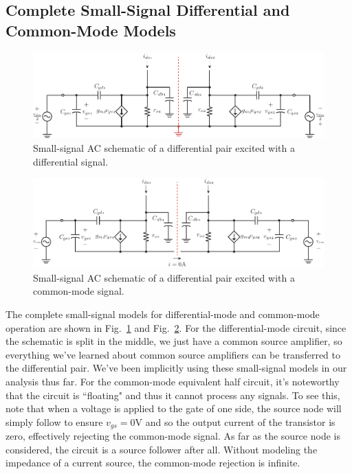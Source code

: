  
\subsection{Complete Small-Signal Differential and Common-Mode Models}

\begin{figure}[tb]
\begin{center}
\includegraphics[width=\columnwidth]{DM_symmetry_small_signal.pdf}
\end{center}
\caption{Small-signal AC schematic of a differential pair excited with a differential signal.} \label{fig:DM_symmetry_small_signal.pdf}
\end{figure}


\begin{figure}[tb]
\begin{center}
\includegraphics[width=\columnwidth]{CM_symmetry_small_signal.pdf}
\end{center}
\caption{Small-signal AC schematic of a differential pair excited with a common-mode signal.} \label{fig:CM_symmetry_small_signal.pdf}
\end{figure}

The complete small-signal models for differential-mode and common-mode operation are shown in Fig.~\ref{fig:DM_symmetry_small_signal.pdf} and Fig.~\ref{fig:CM_symmetry_small_signal.pdf}.  For the differential-mode circuit, since the schematic is split in the middle, we just have a common source amplifier, so everything we've learned about common source amplifiers can be transferred to the differential pair.  We've been implicitly using these small-signal models in our analysis thus far.  For the common-mode equivalent half circuit, it's noteworthy that the circuit is ``floating" and thus it cannot process any signals.  To see this, note that when a voltage is applied to the gate of one side, the source node will simply follow to ensure $v_{gs} = 0$V and so the output current of the transistor is zero, effectively rejecting the common-mode signal.  As far as the source node is considered, the circuit is a source follower after all.  Without modeling the impedance of a current source, the common-mode rejection is infinite.



